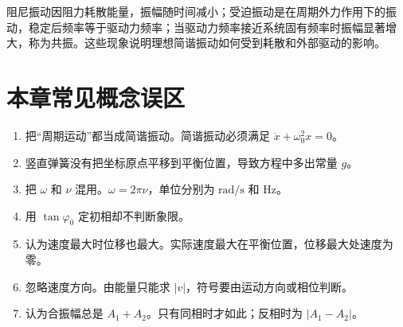 \begin{attention}[阻尼、受迫、共振]
阻尼振动因阻力耗散能量，振幅随时间减小；受迫振动是在周期外力作用下的振动，稳定后频率等于驱动力频率；当驱动力频率接近系统固有频率时振幅显著增大，称为共振。这些现象说明理想简谐振动如何受到耗散和外部驱动的影响。
\end{attention}

\section*{本章常见概念误区}

\begin{pitfall}[机械振动常见错误]
\begin{enumerate}
  \item 把“周期运动”都当成简谐振动。简谐振动必须满足 $\ddot x+\omega_0^2x=0$。
  \item 竖直弹簧没有把坐标原点平移到平衡位置，导致方程中多出常量 $g$。
  \item 把 $\omega$ 和 $\nu$ 混用。$\omega=2\pi\nu$，单位分别为 $\mathrm{rad/s}$ 和 $\mathrm{Hz}$。
  \item 用 $\tan\varphi_0$ 定初相却不判断象限。
  \item 认为速度最大时位移也最大。实际速度最大在平衡位置，位移最大处速度为零。
  \item 忽略速度方向。由能量只能求 $|v|$，符号要由运动方向或相位判断。
  \item 认为合振幅总是 $A_1+A_2$。只有同相时才如此；反相时为 $|A_1-A_2|$。
\end{enumerate}
\end{pitfall}

